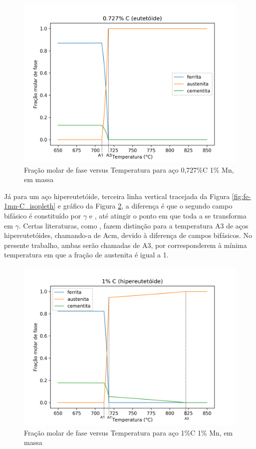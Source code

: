 \documentclass[brazil,tese,epusp]{usp}
\begin{document}
\begin{figure}[ht!]
  \includegraphics[width=1.1\textwidth]{img/Fe-Mn-0727C_edited.png}
  \caption{Fração molar de fase versus Temperatura para aço 0,727\%C 1\% Mn, em massa}
  \label{fig:fe-0727c-1mn}
\end{figure}

Já para um aço hipereutetóide, terceira linha vertical tracejada da Figura \ref{fig:fe-1mn-C_isopleth} e gráfico da Figura \ref{fig:fe-1c-1mn}, a diferença é que o segundo campo bifásico é constituído por $\gamma$ e , até atingir o ponto em que toda a  se transforma em $\gamma$. Certas literaturas, como , fazem distinção para a temperatura A3 de aços hipereutetóides, chamando-a de Acm, devido à diferença de campos bifásicos. No presente trabalho, ambas serão chamadas de A3, por corresponderem à mínima temperatura em que a fração de austenita é igual a 1.

\begin{figure}[ht!]
  \includegraphics[width=1.1\textwidth]{img/Fe-Mn-1C_edited.png}
  \caption{Fração molar de fase versus Temperatura para aço 1\%C 1\% Mn, em massa}
  \label{fig:fe-1c-1mn}
\end{figure}
\end{document}
